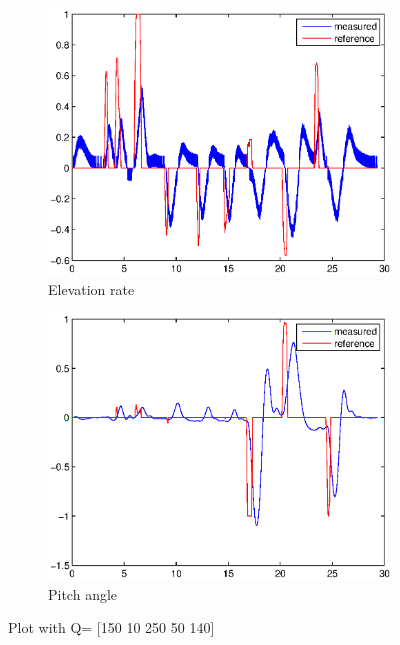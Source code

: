 \begin{figure}[H]
\graphicspath{ {Part3_pictures/}}
\begin{subfigure}{0.5\textwidth}
    \includegraphics[width=0.9\linewidth]{Part3_pictures/p3p3/Q1elevation.eps} 
    \caption{Elevation rate}
\end{subfigure}
\begin{subfigure}{0.5\textwidth}
    \includegraphics[width=0.9\linewidth]{Part3_pictures/p3p3/Q1pitch.eps}
    \caption{Pitch angle}
\end{subfigure}
\caption{Plot with Q= [150 10 250 50 140]}
\end{figure}

